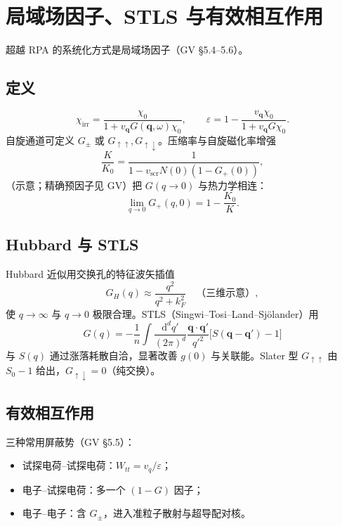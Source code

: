 \section{局域场因子、STLS 与有效相互作用}

超越 RPA 的系统化方式是局域场因子（GV §5.4--5.6）。

\subsection{定义}

\begin{equation}
  \chi_{\mathrm{irr}}
  =\frac{\chi_0}{1+v_{\mathbf{q}}G(\mathbf{q},\omega)\chi_0},
  \qquad
  \varepsilon
  =1-\frac{v_{\mathbf{q}}\chi_0}{1+v_{\mathbf{q}}G\chi_0}.
\label{eq:local_field}
\end{equation}
自旋通道可定义 $G_\pm$ 或 $G_{\uparrow\uparrow},G_{\uparrow\downarrow}$。压缩率与自旋磁化率增强
\begin{equation}
  \frac{K}{K_0}
  =\frac{1}{1-v_{\mathrm{scr}}N(0)(1-G_+(0))},
\end{equation}
（示意；精确预因子见 GV）把 $G(q\to0)$ 与热力学相连：
\begin{equation}
  \lim_{q\to0}G_+(q,0)
  =1-\frac{K_0}{K}.
\end{equation}

\subsection{Hubbard 与 STLS}

Hubbard 近似用交换孔的特征波矢插值
\begin{equation}
  G_H(q)
  \approx
  \frac{q^2}{q^2+k_F^2}
  \quad\text{（三维示意）},
\end{equation}
使 $q\to\infty$ 与 $q\to0$ 极限合理。STLS（Singwi--Tosi--Land--Sj\"olander）用
\begin{equation}
  G(q)
  =-\frac{1}{n}
  \int\frac{\mathrm{d}^d q'}{(2\pi)^d}
  \frac{\mathbf{q}\cdot\mathbf{q}'}{q'^2}
  \bigl[S(\mathbf{q}-\mathbf{q}')-1\bigr]
\end{equation}
与 $S(q)$ 通过涨落耗散自洽，显著改善 $g(0)$ 与关联能。Slater 型 $G_{\uparrow\uparrow}$ 由 $S_0-1$ 给出，$G_{\uparrow\downarrow}=0$（纯交换）。

\subsection{有效相互作用}

三种常用屏蔽势（GV §5.5）：
\begin{itemize}
  \item 试探电荷--试探电荷：$W_{tt}=v_q/\varepsilon$；
  \item 电子--试探电荷：多一个 $(1-G)$ 因子；
  \item 电子--电子：含 $G_\pm$，进入准粒子散射与超导配对核。
\end{itemize}

